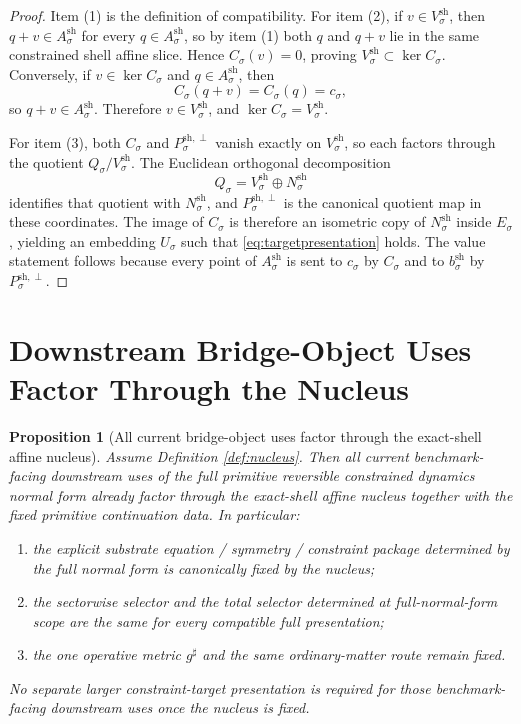 \documentclass[11pt]{article}
\newcommand{\CompletedMetric}{g^{\sharp}}
\newcommand{\CoordSpace}[1]{Q_{#1}}
\newcommand{\ConstraintTarget}[1]{E_{#1}}
\newcommand{\ConstraintMap}[1]{C_{#1}}
\newcommand{\ConstraintValue}[1]{c_{#1}}
\newcommand{\ShellAffine}[1]{A_{#1}^{\mathrm{sh}}}
\newcommand{\ShellDir}[1]{V_{#1}^{\mathrm{sh}}}
\newcommand{\ShellNormal}[1]{N_{#1}^{\mathrm{sh}}}
\newcommand{\ShellProj}[1]{P_{#1}^{\mathrm{sh},\perp}}
\newcommand{\ShellOffset}[1]{b_{#1}^{\mathrm{sh}}}
\newtheorem{proposition}{Proposition}
\begin{document}
\begin{proof}
Item (1) is the definition of compatibility. For item (2), if \(v\in\ShellDir{\sigma}\), then \(q+v\in\ShellAffine{\sigma}\) for every \(q\in\ShellAffine{\sigma}\), so by item (1) both \(q\) and \(q+v\) lie in the same constrained shell affine slice. Hence \(\ConstraintMap{\sigma}(v)=0\), proving \(\ShellDir{\sigma}\subset\ker\ConstraintMap{\sigma}\). Conversely, if \(v\in\ker\ConstraintMap{\sigma}\) and \(q\in\ShellAffine{\sigma}\), then
\[
\ConstraintMap{\sigma}(q+v)
=
\ConstraintMap{\sigma}(q)
=
\ConstraintValue{\sigma},
\]
so \(q+v\in\ShellAffine{\sigma}\). Therefore \(v\in\ShellDir{\sigma}\), and \(\ker\ConstraintMap{\sigma}=\ShellDir{\sigma}\).

For item (3), both \(\ConstraintMap{\sigma}\) and \(\ShellProj{\sigma}\) vanish exactly on \(\ShellDir{\sigma}\), so each factors through the quotient \(\CoordSpace{\sigma}/\ShellDir{\sigma}\). The Euclidean orthogonal decomposition
\[
\CoordSpace{\sigma}=\ShellDir{\sigma}\oplus\ShellNormal{\sigma}
\]
identifies that quotient with \(\ShellNormal{\sigma}\), and \(\ShellProj{\sigma}\) is the canonical quotient map in these coordinates. The image of \(\ConstraintMap{\sigma}\) is therefore an isometric copy of \(\ShellNormal{\sigma}\) inside \(\ConstraintTarget{\sigma}\), yielding an embedding \(U_{\sigma}\) such that \eqref{eq:targetpresentation} holds. The value statement follows because every point of \(\ShellAffine{\sigma}\) is sent to \(\ConstraintValue{\sigma}\) by \(\ConstraintMap{\sigma}\) and to \(\ShellOffset{\sigma}\) by \(\ShellProj{\sigma}\).
\end{proof}

\section{Downstream Bridge-Object Uses Factor Through the Nucleus}

\begin{proposition}[All current bridge-object uses factor through the exact-shell affine nucleus]
\label{prop:factor}
Assume Definition \ref{def:nucleus}. Then all current benchmark-facing downstream uses of the full primitive reversible constrained dynamics normal form already factor through the exact-shell affine nucleus together with the fixed primitive continuation data. In particular:
\begin{enumerate}
    \item the explicit substrate equation / symmetry / constraint package determined by the full normal form is canonically fixed by the nucleus;
    \item the sectorwise selector and the total selector determined at full-normal-form scope are the same for every compatible full presentation;
    \item the one operative metric \(\CompletedMetric\) and the same ordinary-matter route remain fixed.
\end{enumerate}
No separate larger constraint-target presentation is required for those benchmark-facing downstream uses once the nucleus is fixed.
\end{proposition}
\end{document}
